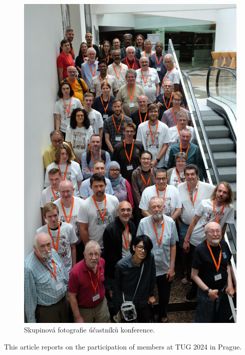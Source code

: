 \documentclass{csbulletin}
\begin{document}
\begin{figure}[p]
\centering
\includegraphics[width=0.9\linewidth]{figs/tug24-group-photo}%
\caption{Skupinová fotografie účastníků konference.}
\end{figure}

\begingroup
\sloppy
\printbibliography
\endgroup

\begin{summary}
This article reports on the participation of \CSTUG{} members at TUG 2024 in Prague.
\end{summary}
\end{document}
